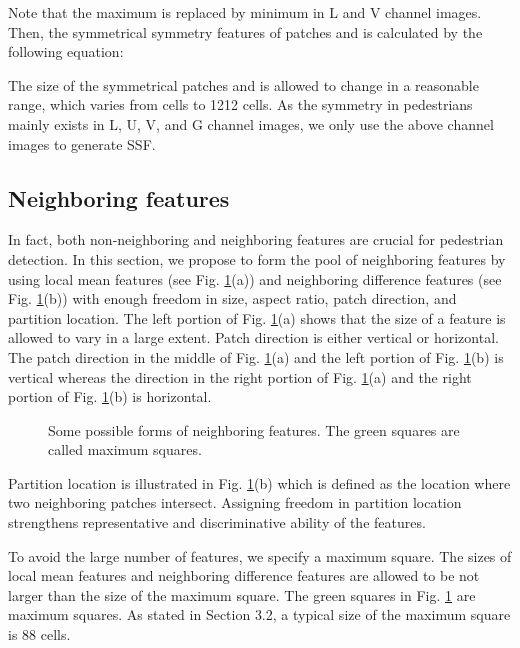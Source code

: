 \documentclass[10pt,twocolumn,letterpaper]{article}
\begin{document}
Note that the maximum is replaced by minimum in L and V channel images. Then, the 
symmetrical symmetry features  of patches  and  is calculated by the following equation:


The size of the symmetrical patches  and 
is allowed to change in a reasonable range, which varies from  
cells to 1212 cells. As the symmetry in pedestrians mainly 
exists in L, U, V, and G channel images, we only use the above channel images to generate SSF.

\subsection{Neighboring features}
In fact, both non-neighboring and neighboring features are crucial for pedestrian detection. In this section, we propose to form the pool of neighboring features by using local mean features (see Fig. \ref{FigNF}(a)) and neighboring difference features (see 
Fig. \ref{FigNF}(b)) with enough freedom in size, aspect ratio, patch direction, and 
partition location. The left portion of Fig. \ref{FigNF}(a) shows that the size of a 
feature is allowed to vary in a large extent. Patch direction is either 
vertical or horizontal. The patch direction in the middle of Fig. \ref{FigNF}(a) and 
the left portion of Fig. \ref{FigNF}(b) is vertical whereas the direction in the right 
portion of Fig. \ref{FigNF}(a) and the right portion of Fig. \ref{FigNF}(b) is horizontal. 


\begin{figure}[!t]
\centering
{}
\vfil
{}
\caption{Some possible forms of neighboring features. The green squares are called maximum squares.}
\label{FigNF}
\end{figure}

Partition location is illustrated in Fig. \ref{FigNF}(b) which is defined as the 
location where two neighboring patches intersect. Assigning freedom in 
partition location strengthens representative and discriminative ability of 
the features. 

To avoid the large number of features, we specify a maximum square. 
The sizes of local mean features and neighboring difference features are 
allowed to be not larger than the size of the maximum square. The green squares in 
Fig. \ref{FigNF} are maximum squares. As stated in Section 3.2, a typical size of 
the maximum square is 88 cells. 
\end{document}
